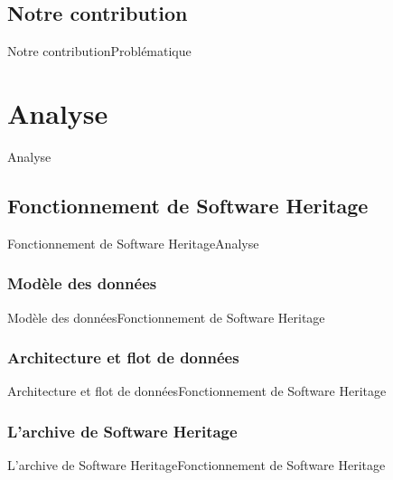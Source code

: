 \documentclass{beamer}
\begin{document}
  \subsection{Notre contribution}
    \begin{frame}{Notre contribution}{Problématique}
    \end{frame}

\section{Analyse}
  \begin{frame}{Analyse}
  \end{frame}

  \subsection{Fonctionnement de Software Heritage}
    \begin{frame}{Fonctionnement de Software Heritage}{Analyse}
    \end{frame}

    \subsubsection{Modèle des données}
      \begin{frame}{Modèle des données}{Fonctionnement de Software Heritage}
      \end{frame}

    \subsubsection{Architecture et flot de données}
      \begin{frame}{Architecture et flot de données}{Fonctionnement de Software Heritage}
      \end{frame}

    \subsubsection{L'archive de Software Heritage}
      \begin{frame}{L'archive de Software Heritage}{Fonctionnement de Software Heritage}
      \end{frame}
\end{document}
